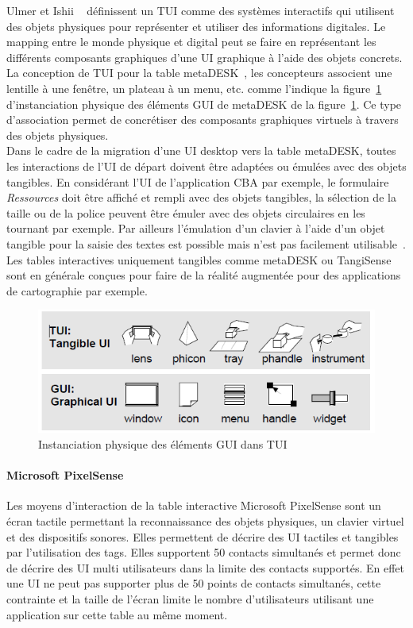 Ulmer et Ishii ~\cite{Ishii1997} définissent un TUI comme des systèmes interactifs qui utilisent des objets physiques pour représenter et utiliser des informations digitales. Le mapping entre le monde physique et digital peut se faire en représentant les différents composants graphiques d'une UI graphique à l'aide des objets concrets. La conception de TUI pour la table metaDESK~\cite{Ishii1997}, les concepteurs associent une lentille à une fenêtre, un plateau à un menu, etc. comme l'indique la figure~\ref{fig:chap2:12} d'instanciation physique des éléments GUI de metaDESK de la figure~\ref{fig:chap2:12}. Ce type d'association permet de concrétiser des composants graphiques virtuels à travers des objets physiques.\\
Dans le cadre de la migration d'une UI desktop vers la table metaDESK, toutes les interactions de l'UI de départ doivent être adaptées ou émulées avec des objets tangibles. En considérant l'UI de l'application CBA par exemple, le formulaire \textit{Ressources} doit être affiché et rempli avec des objets tangibles, la sélection de la taille ou de la police peuvent être émuler avec des objets circulaires en les tournant par exemple. Par ailleurs l'émulation d'un clavier à l'aide d'un objet tangible pour la saisie des textes est possible mais n'est pas facilement utilisable~\cite{MenuTangible}. Les tables interactives uniquement tangibles comme metaDESK ou TangiSense~\cite{Kubicki2009} sont en générale conçues pour faire de la réalité augmentée pour des applications de cartographie par exemple.
\begin{figure}[ht]
\begin{center}
\includegraphics[angle=270,scale=.6]{chap2/img-12}
\caption{Instanciation physique des éléments GUI dans TUI}
\label{fig:chap2:12}
\end{center}
\end{figure}

\paragraph {Microsoft PixelSense }
\label{sec:chap2:3:1:3}
Les moyens d'interaction de la table interactive Microsoft PixelSense sont un écran tactile permettant la reconnaissance des objets physiques, un clavier virtuel et des dispositifs sonores. Elles permettent de décrire des UI tactiles et tangibles par l'utilisation des tags. Elles supportent  50 contacts simultanés et permet donc de décrire des UI multi utilisateurs dans la limite des contacts supportés. En effet une UI ne peut pas supporter plus de 50 points de contacts simultanés, cette contrainte et la taille de l'écran limite le nombre d'utilisateurs utilisant une application sur cette table au même moment.


